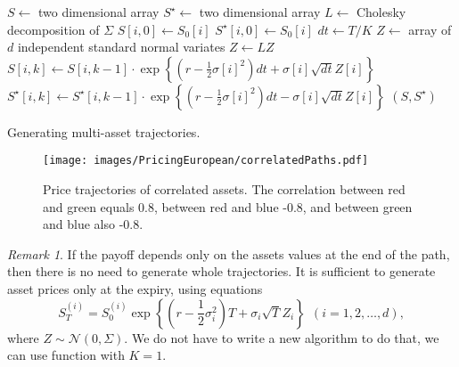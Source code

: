 \documentclass[a4paper,11pt, twoside]{book}
\theoremstyle{definition}
\theoremstyle{remark}
\newtheorem{remark}{Remark}[chapter]
\newcounter{example}[chapter]
\begin{document}
\begin{algorithm}
 \begin{algorithmic}[1]
  
  \State $S \gets$ two dimensional array 
  \State $S^\star \gets$ two dimensional array 
  \State $L \gets$ Cholesky decomposition of $\Sigma$ 
    \State $S[i,0] \gets S_0[i]$
    \State $S^\star[i,0] \gets S_0[i]$
  \EndFor
  \State $dt \gets T/K$
    \State $Z \gets$ array of $d$ independent standard normal variates
    \State $Z \gets LZ$ 
      \State $S[i, k] \gets S[i, k-1] \cdot \exp\left\{ (r - \frac{1}{2}\sigma[i]^2) dt + \sigma[i] \sqrt{dt} Z[i] \right\}$
      \State $S^\star[i, k] \gets S^\star[i, k-1] \cdot \exp\left\{ (r - \frac{1}{2}\sigma[i]^2) dt - \sigma[i] \sqrt{dt} Z[i] \right\}$
    \EndFor
  \EndFor
  \State \Return $(S, S^\star)$
  \EndFunction
 \end{algorithmic}
 \caption{Generating multi-asset trajectories.}
 \label{alg:multi-tr}
\end{algorithm}

\begin{figure}
\centering
 \texttt{[image: images/PricingEuropean/correlatedPaths.pdf]}
\caption{Price trajectories of correlated assets. The correlation between red and green equals 0.8, between red and blue -0.8, and between green and blue also -0.8.}
\label{fig:corrPaths}
\end{figure}

\begin{remark}
 If the payoff depends only on the assets values at the end of the path, then there is no need to generate whole trajectories. It is sufficient to generate asset prices only at the expiry, using equations
 \[ S^{(i)}_T = S^{(i)}_0 \exp\left\{ (r - \frac{1}{2}\sigma_i^2)T + \sigma_i \sqrt{T} Z_i \right\} \ \ (i = 1,2,\ldots,d),\]
  where  $Z \sim \mathcal{N}(0, \Sigma)$. We do not have to write a new algorithm to do that, we can use function 
 with $K=1$.

\end{remark}
\end{document}
